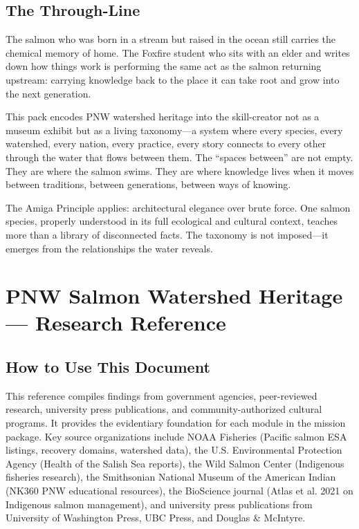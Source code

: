 \documentclass[11pt,letterpaper]{article}
\newcommand{\stageheader}[2]{%
  \noindent\colorbox{#2}{\makebox[\textwidth][l]{%
    \textcolor{white}{\bfseries\sffamily\hspace{6pt}#1\hspace{6pt}}}}%
  \vspace{0.5em}\par%
}
\begin{document}
\subsection{The Through-Line}

\begin{quotebox}
The salmon who was born in a stream but raised in the ocean still carries the chemical memory of home. The Foxfire student who sits with an elder and writes down how things work is performing the same act as the salmon returning upstream: carrying knowledge back to the place it can take root and grow into the next generation.

This pack encodes PNW watershed heritage into the skill-creator not as a museum exhibit but as a living taxonomy---a system where every species, every watershed, every nation, every practice, every story connects to every other through the water that flows between them. The ``spaces between'' are not empty. They are where the salmon swims. They are where knowledge lives when it moves between traditions, between generations, between ways of knowing.

The Amiga Principle applies: architectural elegance over brute force. One salmon species, properly understood in its full ecological and cultural context, teaches more than a library of disconnected facts. The taxonomy is not imposed---it emerges from the relationships the water reveals.
\end{quotebox}

\newpage

\stageheader{STAGE 2 --- RESEARCH REFERENCE}{secondary}

\section{PNW Salmon Watershed Heritage --- Research Reference}

\subsection{How to Use This Document}

This reference compiles findings from government agencies, peer-reviewed research, university press publications, and community-authorized cultural programs. It provides the evidentiary foundation for each module in the mission package. Key source organizations include NOAA Fisheries (Pacific salmon ESA listings, recovery domains, watershed data), the U.S. Environmental Protection Agency (Health of the Salish Sea reports), the Wild Salmon Center (Indigenous fisheries research), the Smithsonian National Museum of the American Indian (NK360 PNW educational resources), the BioScience journal (Atlas et al. 2021 on Indigenous salmon management), and university press publications from University of Washington Press, UBC Press, and Douglas \& McIntyre.
\end{document}
